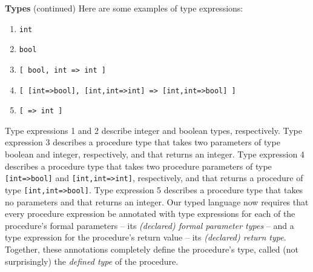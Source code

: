 \begin{minipage}[t]{\sw}
\slidenumber
\LARGE
{\bf Types} (continued)\exx
Here are some examples of type expressions:
\Large
\begin{enumerate}
\setlength{\itemsep}{0ex}
\item \verb'int'
\item \verb'bool'
\item \verb'[ bool, int => int ]'
\item \verb'[ [int=>bool], [int,int=>int] => [int,int=>bool] ]'
\item \verb'[ => int ]'
\end{enumerate}
\LARGE
Type expressions 1 and 2 describe integer and boolean types,
respectively.
Type expression 3 describes a procedure type
that takes two parameters of type boolean and integer, respectively,
and that returns an integer.
Type expression 4 describes a procedure type
that takes two procedure parameters
of type \verb'[int=>bool]' and \verb'[int,int=>int]',
respectively, and that returns a procedure
of type \verb'[int,int=>bool]'.
Type expression 5 describes a procedure type
that takes no parameters and that returns an integer.\exx
Our typed language now requires
that every procedure expression be annotated
with type expressions for each of the procedure's formal parameters --
its {\em (declared) formal parameter types} --
and a type expression for the procedure's return value --
its {\em (declared) return type}.
Together, these annotations completely define the procedure's type,
called (not surprisingly) the {\em defined type} of the procedure.
\end{minipage}
